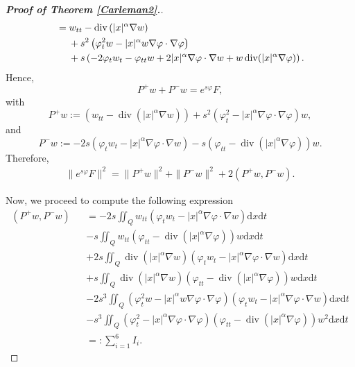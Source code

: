 \documentclass[11pt]{article}
\numberwithin{equation}{section}
\def\vp{\varphi}
\def\bf{\textbf}
\def\al{\alpha}
\def\df{\mathrm d}
\DeclareMathOperator{\Div}{div}
\begin{document}
\begin{proof}[{\rm \bf { Proof of  Theorem \ref{Carleman2}.}}]
\begin{equation*}
\begin{split}
					&=w_{tt}-\Div\left(|x|^\al \nabla w\right)\\
					&\hspace{4.5mm}+s^2\left(\vp_t^2w-|x|^\al w\nabla\vp\cdot \nabla\vp\right)\\
					&\hspace{4.5mm}+s\left(-2\vp_tw_t-\vp_{tt}w+2|x|^\al \nabla\vp\cdot \nabla w+w\Div(|x|^\al \nabla\vp)\right).
				\end{split}
			\end{equation*}
			Hence,
			\begin{equation*}
				P^+w+P^-w=e^{s\vp}F,
			\end{equation*}
			with
			\begin{equation*}
				P^+w:=\left(w_{tt}-\Div\left(|x|^\al \nabla w\right)\right)+s^2\left(\vp_t^2-|x|^\al \nabla\vp\cdot \nabla\vp\right)w,
			\end{equation*}
			and
			\begin{equation*}
				P^-w:=-2s\left(\vp_tw_t-|x|^\al \nabla\vp\cdot \nabla w\right)-s\left(\vp_{tt}-\Div(|x|^\al \nabla\vp)\right)w.
			\end{equation*}
			Therefore,
			\begin{equation*}
				\begin{split}
					\|e^{s\vp}F\|^2=\|P^+w\|^2+\|P^-w\|^2+2(P^+w, P^-w).
				\end{split}
			\end{equation*}
			
			
			Now, we proceed to compute the following expression
			\begin{eqnarray*}
				(P^+w, P^-w)
				&&=-2s\iint_Q w_{tt}(\vp_tw_t-|x|^\al \nabla\vp\cdot \nabla w)\df x\df t\\ %
				&& -s\iint_Qw_{tt}(\vp_{tt}-\Div (|x|^\al \nabla\vp))w\df x\df t\\ %
				&&+2s\iint_Q \Div(|x|^\al \nabla w) \left(\vp_tw_t-|x|^\al \nabla\vp\cdot \nabla w\right)\df x\df t\\ %
				&& +s\iint_Q\Div(|x|^\al \nabla w)\left(\vp_{tt}-\Div (|x|^\al \nabla \vp)\right)w\df x\df t\\ %
				&&-2s^3\iint_Q(\vp_t^2w-|x|^\al w\nabla\vp\cdot \nabla\vp)\left(\vp_t w_t-|x|^\al \nabla\vp\cdot \nabla w\right)\df x\df t\\ %
				&& -s^3\iint_Q\left(\vp_t^2-|x|^\al \nabla\vp\cdot \nabla\vp\right) \left(\vp_{tt}-\Div (|x|^\al \nabla\vp)\right)w^2 \df x\df t\\ %
				&&=:\sum_{i=1}^6 I_i.
			\end{eqnarray*}
			

\end{proof}
\end{document}

